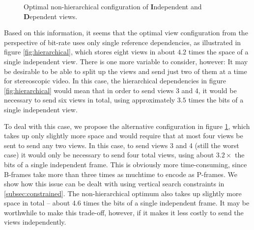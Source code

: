 \documentclass{sig-alternate-05-2015}
\begin{document}
\begin{figure}[H]
\begin{center}
\end{center}
\caption{
Optimal non-hierarchical configuration of \textbf{I}ndependent and
\textbf{D}ependent views.
}
\label{fig:optimal}
\end{figure}

Based on this information, it seems that the optimal view configuration from the
perspective of bit-rate uses only single reference dependencies, as illustrated
in figure \ref{fig:hierarchical}, which stores eight views in about $4.2$ times
the space of a single independent view. There is one more variable to consider,
however: It may be desirable to be able to split up the views and send just two
of them at a time for stereoscopic video. In this case, the hierarchical
dependencies in figure \ref{fig:hierarchical} would mean that in order to send
views 3 and 4, it would be necessary to send six views in total, using
approximately $3.5$ times the bits of a single independent view.

To deal with this case, we propose the alternative  configuration in figure
\ref{fig:optimal}, which takes up only slightly more space and would require
that at most four views be sent to send any two views. In this case, to send
views 3 and 4 (still the worst case) it would only be necessary to send four
total views, using about $3.2\times$ the bits of a single independent frame.
This is obviously more time-consuming, since B-frames take more than three times
as muchtime to encode as P-frames. We show how this issue can be dealt with
using vertical search constraints in \ref{subsec:constrained}. The
non-hierarchical optimum also takes up slightly more space in total -- about 4.6
times the bits of a single independent frame. It may be worthwhile to make this
trade-off, however, if it makes it less costly to send the views independently.
\end{document}
